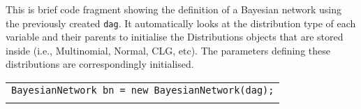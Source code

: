This is brief code fragment showing the definition of a Bayesian network using the previously created \texttt{dag}. It automatically looks at the distribution type of each variable and their parents to initialise the Distributions objects that are stored inside (i.e., Multinomial, Normal, CLG, etc). The parameters defining these distributions are correspondingly initialised.

\begin{table}[H]
\begin{tabular}{l} \hline

        \texttt{BayesianNetwork bn = new BayesianNetwork(dag);}\\ \\ \hline

\end{tabular}
\end{table}        
